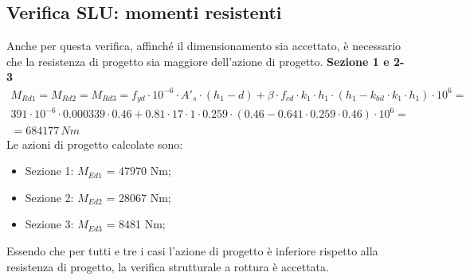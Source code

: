 \subsection{Verifica SLU: momenti resistenti}
Anche per questa verifica, affinché il dimensionamento sia accettato, è necessario che la resistenza di progetto sia maggiore dell'azione di progetto. 
\textbf{Sezione 1 e 2-3}
\begin{equation*}
    \begin{split}
        M_{Rd1} = M_{Rd2} = M_{Rd3} = f_{yd} \cdot 10^{-6} \cdot A'_s \cdot (h_1-d) + \beta \cdot f_{cd} \cdot k_1 \cdot h_1 \cdot (h_1 - k_{bil} \cdot k_1 \cdot h_1) \cdot 10^6=\\
        391 \cdot 10^{-6} \cdot 0.000339 \cdot 0.46 + 0.81 \cdot 17 \cdot 1 \cdot 0.259 \cdot (0.46 - 0.641 \cdot 0.259 \cdot 0.46) \cdot 10^6 =\\
         =684177 \,Nm
    \end{split}
\end{equation*}
Le azioni di progetto calcolate sono:
\begin{itemize}
    \item Sezione 1: $M_{Ed1}$ = 47970 Nm;
    \item Sezione 2: $M_{Ed2}$ = 28067 Nm;
    \item Sezione 3: $M_{Ed3}$ = 8481 Nm;
\end{itemize}
Essendo che per tutti e tre i casi l'azione di progetto è inferiore rispetto alla resistenza di progetto, la verifica strutturale a rottura è accettata.
